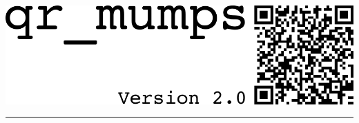 

\begin{adjustwidth}{-0em}{-0em}
\thispagestyle{empty}


\vspace{10cm}

{\noindent\hfill \includegraphics[width=0.9\linewidth]{figures/qrqr_cover.pdf}}

\noindent\rule{\linewidth}{5pt}\\[2.5ex]

\vspace{1cm}





\end{adjustwidth}
